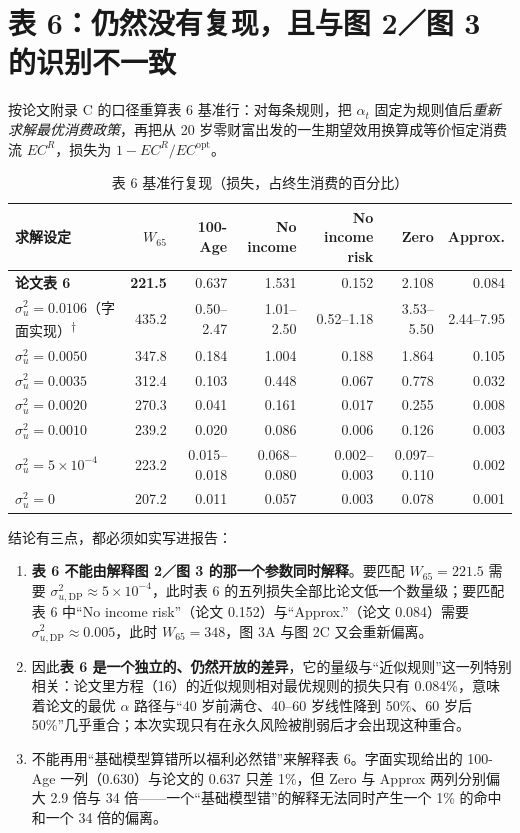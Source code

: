 \documentclass[UTF8,a4paper,11pt,fontset=fandol]{ctexart}
\newcommand{\su}{\sigma_u^2}
\newcommand{\suDP}{\sigma_{u,\mathrm{DP}}^{2}}
\begin{document}
\section{表 6：仍然没有复现，且与图 2／图 3 的识别不一致}

按论文附录 C 的口径重算表 6 基准行：对每条规则，把 \(\alpha_t\) 固定为规则值后\emph{重新求解最优消费政策}，再把从 20 岁零财富出发的一生期望效用换算成等价恒定消费流 \(EC^R\)，损失为 \(1-EC^R/EC^{\text{opt}}\)。

\begin{table}[htbp]\centering\small
\caption{表 6 基准行复现（损失，占终生消费的百分比）}\label{tab:table6}\vspace{-2pt}
\begin{tabular}{@{}lrrrrrr@{}}\toprule
求解设定 & \(W_{65}\) & 100-Age & No income & No income risk & Zero & Approx.\\\midrule
\textbf{论文表 6} & \textbf{221.5} & 0.637 & 1.531 & 0.152 & 2.108 & 0.084\\
\(\su=0.0106\)（字面实现）\textsuperscript{\(\dagger\)} & 435.2 & 0.50--2.47 & 1.01--2.50 & 0.52--1.18 & 3.53--5.50 & 2.44--7.95\\
\(\su=0.0050\) & 347.8 & 0.184 & 1.004 & 0.188 & 1.864 & 0.105\\
\(\su=0.0035\) & 312.4 & 0.103 & 0.448 & 0.067 & 0.778 & 0.032\\
\(\su=0.0020\) & 270.3 & 0.041 & 0.161 & 0.017 & 0.255 & 0.008\\
\(\su=0.0010\) & 239.2 & 0.020 & 0.086 & 0.006 & 0.126 & 0.003\\
\(\su=5\times10^{-4}\) & 223.2 & 0.015--0.018 & 0.068--0.080 & 0.002--0.003 & 0.097--0.110 & 0.002\\
\(\su=0\) & 207.2 & 0.011 & 0.057 & 0.003 & 0.078 & 0.001\\\bottomrule
\end{tabular}
\end{table}

结论有三点，都必须如实写进报告：
\begin{enumerate}[leftmargin=2.2em,itemsep=2pt]
\item \textbf{表 6 不能由解释图 2／图 3 的那一个参数同时解释}。要匹配 \(W_{65}=221.5\) 需要 \(\suDP\approx5\times10^{-4}\)，此时表 6 的五列损失全部比论文低一个数量级；要匹配表 6 中“No income risk”（论文 0.152）与“Approx.”（论文 0.084）需要 \(\suDP\approx0.005\)，此时 \(W_{65}=348\)，图 3A 与图 2C 又会重新偏离。
\item 因此\textbf{表 6 是一个独立的、仍然开放的差异}，它的量级与“近似规则”这一列特别相关：论文里方程（16）的近似规则相对最优规则的损失只有 0.084\%，意味着论文的最优 \(\alpha\) 路径与“40 岁前满仓、40--60 岁线性降到 50\%、60 岁后 50\%”几乎重合；本次实现只有在永久风险被削弱后才会出现这种重合。
\item 不能再用“基础模型算错所以福利必然错”来解释表 6。字面实现给出的 100-Age 一列（0.630）与论文的 0.637 只差 1\%，但 Zero 与 Approx 两列分别偏大 2.9 倍与 34 倍——一个“基础模型错”的解释无法同时产生一个 1\% 的命中和一个 34 倍的偏离。
\end{enumerate}
\end{document}
